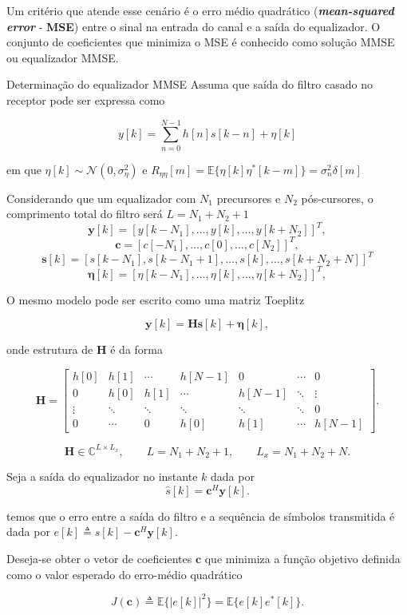 \documentclass[
  ignorenonframetext,
]{beamer}
\begin{document}
\begin{frame}
Um critério que atende esse cenário
é o erro médio quadrático (\textbf{\emph{mean-squared error}} -
\textbf{MSE}) entre o sinal na entrada do canal e a saída do
equalizador. O conjunto de coeficientes que minimiza o MSE é conhecido
como solução MMSE ou equalizador MMSE.
\end{frame}
\begin{frame}{Determinação do equalizador MMSE}
\label{determinauxe7uxe3o-do-equalizador-mmse}
Assuma que saída do filtro casado no receptor pode ser expressa como

\[
y[k]=\sum_{n=0}^{N-1} h[n]s[k-n]+\eta[k]
\]

em que \(\eta[k] \sim \mathcal{N}(0,\sigma_\eta^2)\) e
\(R_{\eta\eta}[m] = \mathbb{E}\{\eta[k]\eta^*[k-m]\}=\sigma_n^2\delta[m]\)

Considerando que um equalizador com \(N_1\) precursores e \(N_2\)
pós-cursores, o comprimento total do filtro será $L=N_1+N_2+1$
\[
\mathbf{y}[k]=[y[k-N_1],\ldots, y[k], \ldots ,y[k+N_2]]^T,
\]
\[
\mathbf{c}=[c[-N_1],\ldots, c[0], \ldots ,c[N_2]]^T,
\]
\[ \mathbf{s}[k] = \left[s[k-N_1], s[k-N_1+1],\ldots,s[k],\ldots, s[k+N_2+N]\right]^T\]
\[
\mathbf{\eta}[k]=[\eta[k-N_1],\ldots, \eta[k], \ldots ,\eta[k+N_2]]^T,
\]
\end{frame}

\begin{frame}
O mesmo modelo pode ser escrito como uma matriz Toeplitz

\[
\mathbf{y}[k]=\mathbf{H}\mathbf{s}[k]+\mathbf{\eta}[k],
\]

onde estrutura de \(\mathbf{H}\) é da forma

\[
\mathbf{H}=
\begin{bmatrix}
h[0] & h[1]  & \cdots & h[N-1] & 0 & \cdots & 0\\
0 & h[0] & h[1]  & \cdots & h[N-1] & \ddots & \vdots\\
\vdots & \ddots & \ddots & \ddots & \ddots & \ddots & 0\\
0 & \cdots & 0 & h[0] & h[1]  & \cdots & h[N-1]
\end{bmatrix}.
\]

\[
\mathbf{H}\in\mathbb{C}^{L\times L_x},
\qquad
L=N_1+N_2+1,
\qquad
L_x=N_1+N_2+N.
\]

\end{frame}

\begin{frame}
Seja a saída do equalizador no instante \(k\) dada por \[
\hat s[k]=\mathbf{c}^H\mathbf{y}[k].
\]

temos que o erro entre a saída do filtro e a sequência de símbolos
transmitida é dada por
\(e[k]\triangleq s[k]-\mathbf{c}^H\mathbf{y}[k]\).

Deseja-se obter o vetor de coeficientes \(\mathbf{c}\) que minimiza a
função objetivo definida como o valor esperado do erro-médio quadrático

\[
J(\mathbf{c})\triangleq \mathbb{E}\{|e[k]|^2\} = \mathbb{E}\{e[k]e^*[k]\}.
\]

\end{frame}
\end{document}
